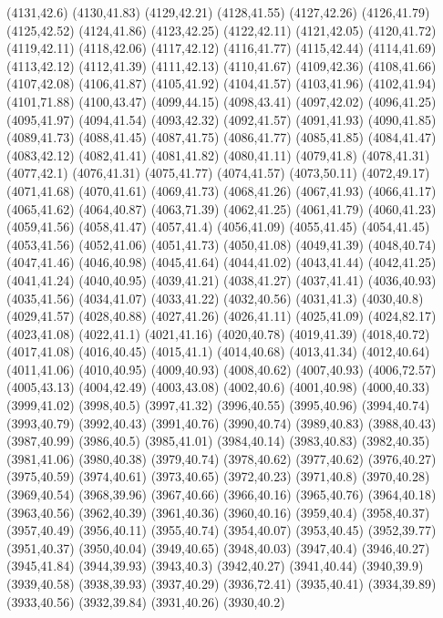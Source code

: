 (4131,42.6)
(4130,41.83)
(4129,42.21)
(4128,41.55)
(4127,42.26)
(4126,41.79)
(4125,42.52)
(4124,41.86)
(4123,42.25)
(4122,42.11)
(4121,42.05)
(4120,41.72)
(4119,42.11)
(4118,42.06)
(4117,42.12)
(4116,41.77)
(4115,42.44)
(4114,41.69)
(4113,42.12)
(4112,41.39)
(4111,42.13)
(4110,41.67)
(4109,42.36)
(4108,41.66)
(4107,42.08)
(4106,41.87)
(4105,41.92)
(4104,41.57)
(4103,41.96)
(4102,41.94)
(4101,71.88)
(4100,43.47)
(4099,44.15)
(4098,43.41)
(4097,42.02)
(4096,41.25)
(4095,41.97)
(4094,41.54)
(4093,42.32)
(4092,41.57)
(4091,41.93)
(4090,41.85)
(4089,41.73)
(4088,41.45)
(4087,41.75)
(4086,41.77)
(4085,41.85)
(4084,41.47)
(4083,42.12)
(4082,41.41)
(4081,41.82)
(4080,41.11)
(4079,41.8)
(4078,41.31)
(4077,42.1)
(4076,41.31)
(4075,41.77)
(4074,41.57)
(4073,50.11)
(4072,49.17)
(4071,41.68)
(4070,41.61)
(4069,41.73)
(4068,41.26)
(4067,41.93)
(4066,41.17)
(4065,41.62)
(4064,40.87)
(4063,71.39)
(4062,41.25)
(4061,41.79)
(4060,41.23)
(4059,41.56)
(4058,41.47)
(4057,41.4)
(4056,41.09)
(4055,41.45)
(4054,41.45)
(4053,41.56)
(4052,41.06)
(4051,41.73)
(4050,41.08)
(4049,41.39)
(4048,40.74)
(4047,41.46)
(4046,40.98)
(4045,41.64)
(4044,41.02)
(4043,41.44)
(4042,41.25)
(4041,41.24)
(4040,40.95)
(4039,41.21)
(4038,41.27)
(4037,41.41)
(4036,40.93)
(4035,41.56)
(4034,41.07)
(4033,41.22)
(4032,40.56)
(4031,41.3)
(4030,40.8)
(4029,41.57)
(4028,40.88)
(4027,41.26)
(4026,41.11)
(4025,41.09)
(4024,82.17)
(4023,41.08)
(4022,41.1)
(4021,41.16)
(4020,40.78)
(4019,41.39)
(4018,40.72)
(4017,41.08)
(4016,40.45)
(4015,41.1)
(4014,40.68)
(4013,41.34)
(4012,40.64)
(4011,41.06)
(4010,40.95)
(4009,40.93)
(4008,40.62)
(4007,40.93)
(4006,72.57)
(4005,43.13)
(4004,42.49)
(4003,43.08)
(4002,40.6)
(4001,40.98)
(4000,40.33)
(3999,41.02)
(3998,40.5)
(3997,41.32)
(3996,40.55)
(3995,40.96)
(3994,40.74)
(3993,40.79)
(3992,40.43)
(3991,40.76)
(3990,40.74)
(3989,40.83)
(3988,40.43)
(3987,40.99)
(3986,40.5)
(3985,41.01)
(3984,40.14)
(3983,40.83)
(3982,40.35)
(3981,41.06)
(3980,40.38)
(3979,40.74)
(3978,40.62)
(3977,40.62)
(3976,40.27)
(3975,40.59)
(3974,40.61)
(3973,40.65)
(3972,40.23)
(3971,40.8)
(3970,40.28)
(3969,40.54)
(3968,39.96)
(3967,40.66)
(3966,40.16)
(3965,40.76)
(3964,40.18)
(3963,40.56)
(3962,40.39)
(3961,40.36)
(3960,40.16)
(3959,40.4)
(3958,40.37)
(3957,40.49)
(3956,40.11)
(3955,40.74)
(3954,40.07)
(3953,40.45)
(3952,39.77)
(3951,40.37)
(3950,40.04)
(3949,40.65)
(3948,40.03)
(3947,40.4)
(3946,40.27)
(3945,41.84)
(3944,39.93)
(3943,40.3)
(3942,40.27)
(3941,40.44)
(3940,39.9)
(3939,40.58)
(3938,39.93)
(3937,40.29)
(3936,72.41)
(3935,40.41)
(3934,39.89)
(3933,40.56)
(3932,39.84)
(3931,40.26)
(3930,40.2)
